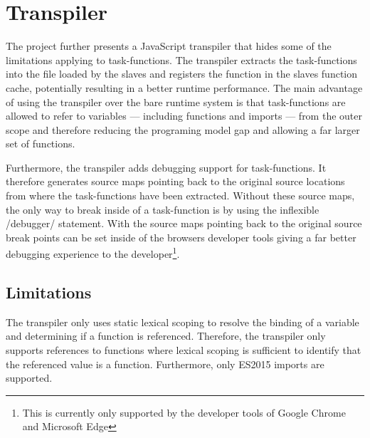 \section{Transpiler}\label{sec:transpiler}
The project further presents a JavaScript transpiler that hides some of the limitations applying to task-functions. The transpiler extracts the task-functions into the file loaded by the slaves and registers the function in the slaves function cache, potentially resulting in a better runtime performance. The main advantage of using the transpiler over the bare runtime system is that task-functions are allowed to refer to variables --- including functions and imports --- from the outer scope and therefore reducing the programing model gap and allowing a far larger set of functions.


Furthermore, the transpiler adds debugging support for task-functions. It therefore generates source maps pointing back to the original source locations from where the task-functions have been extracted. Without these source maps, the only way to break inside of a task-function is by using the inflexible \javascriptinline/debugger/ statement. With the source maps pointing back to the original source break points can be set inside of the browsers developer tools giving a far better debugging experience to the developer\footnote{This is currently only supported by the developer tools of Google Chrome and Microsoft Edge}.

\subsection{Limitations}
The transpiler only uses static lexical scoping to resolve the binding of a variable and determining if a function is referenced. Therefore, the transpiler only supports references to functions where lexical scoping is sufficient to identify that the referenced value is a function. Furthermore, only ES2015 imports are supported. 

